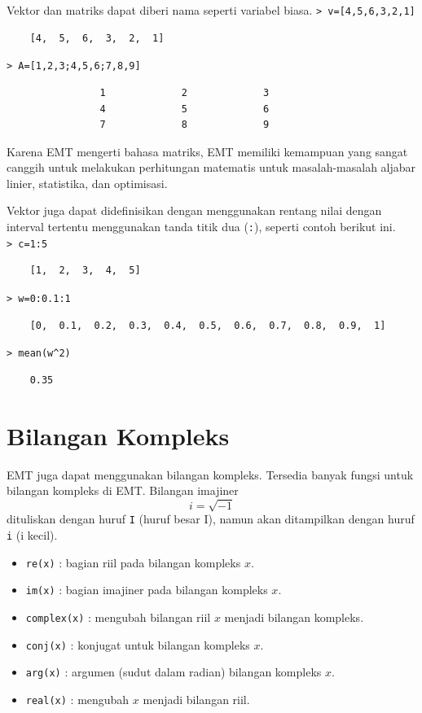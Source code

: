 \documentclass[11pt, a4paper]{article}
\newcommand{\emtcmd}[1]{\noindent\texttt{\textcolor{emtcommand}{>}\ #1}\par\smallskip}
\begin{document}
Vektor dan matriks dapat diberi nama seperti variabel biasa.
\emtcmd{v=[4,5,6,3,2,1]}
\begin{verbatim}
    [4,  5,  6,  3,  2,  1]
\end{verbatim}

\emtcmd{A=[1,2,3;4,5,6;7,8,9]}
\begin{verbatim}
                1             2             3 
                4             5             6 
                7             8             9 
\end{verbatim}

Karena EMT mengerti bahasa matriks, EMT memiliki kemampuan yang sangat canggih untuk melakukan perhitungan matematis untuk masalah-masalah aljabar linier, statistika, dan optimisasi.

Vektor juga dapat didefinisikan dengan menggunakan rentang nilai dengan interval tertentu menggunakan tanda titik dua (\texttt{:}), seperti contoh berikut ini.
\emtcmd{c=1:5}
\begin{verbatim}
    [1,  2,  3,  4,  5]
\end{verbatim}

\emtcmd{w=0:0.1:1}
\begin{verbatim}
    [0,  0.1,  0.2,  0.3,  0.4,  0.5,  0.6,  0.7,  0.8,  0.9,  1]
\end{verbatim}

\emtcmd{mean(w\^{}2)}
\begin{verbatim}
    0.35
\end{verbatim}

\section*{Bilangan Kompleks}

EMT juga dapat menggunakan bilangan kompleks. Tersedia banyak fungsi untuk bilangan kompleks di EMT. Bilangan imajiner
$$i = \sqrt{-1}$$
dituliskan dengan huruf \texttt{I} (huruf besar I), namun akan ditampilkan dengan huruf \texttt{i} (i kecil).

\begin{itemize}
    \item \texttt{re(x)} : bagian riil pada bilangan kompleks $x$.
    \item \texttt{im(x)} : bagian imajiner pada bilangan kompleks $x$.
    \item \texttt{complex(x)} : mengubah bilangan riil $x$ menjadi bilangan kompleks.
    \item \texttt{conj(x)} : konjugat untuk bilangan kompleks $x$.
    \item \texttt{arg(x)} : argumen (sudut dalam radian) bilangan kompleks $x$.
    \item \texttt{real(x)} : mengubah $x$ menjadi bilangan riil.
\end{itemize}
\end{document}
